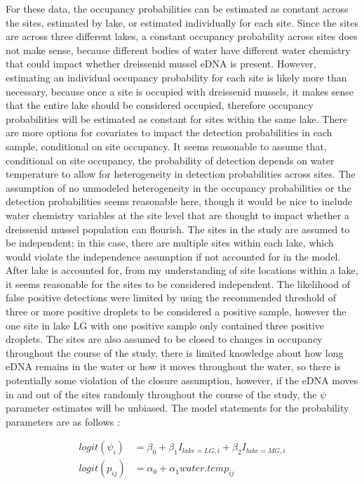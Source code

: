 \documentclass[12pt]{article}\usepackage[]{graphicx}\usepackage[]{color}
\begin{document}
For these data, the occupancy probabilities can be estimated as constant across the sites, estimated by lake, or estimated individually for each site. Since the sites are across three different lakes, a constant occupancy probability across sites does not make sense, because different bodies of water have different water chemistry that could impact whether dreissenid mussel eDNA is present. However, estimating an individual occupancy probability for each site is likely more than necessary, because once a site is occupied with dreissenid mussels, it makes sense that the entire lake should be considered occupied, therefore occupancy probabilities will be estimated as constant for sites within the same lake. There are more options for covariates to impact the detection probabilities in each sample, conditional on site occupancy. It seems reasonable to assume that, conditional on site occupancy, the probability of detection depends on water temperature to allow for heterogeneity in detection probabilities across sites. The assumption of no unmodeled heterogeneity in the occupancy probabilities or the detection probabilities seems reasonable here, though it would be nice to include water chemistry variables at the site level that are thought to impact whether a dreissenid mussel population can flourish. The sites in the study are assumed to be independent; in this case, there are multiple sites within each lake, which would violate the independence assumption if not accounted for in the model. After lake is accounted for, from my understanding of site locations within a lake, it seems reasonable for the sites to be considered independent. The likelihood of false positive detections were limited by using the recommended threshold of three or more positive droplets to be considered a positive sample, however the one site in lake LG with one positive sample only contained three positive droplets. The sites are also assumed to be closed to changes in occupancy throughout the course of the study, there is limited knowledge about how long eDNA remains in the water or how it moves throughout the water, so there is potentially some violation of the closure assumption, however, if the eDNA moves in and out of the sites randomly throughout the course of the study, the $\psi$ parameter estimates will be unbiased. The model statements for the probability parameters are as follows :  

$$
\begin{aligned}
logit(\psi_i) &= \beta_0 + \beta_1I_{lake = LG, i} + \beta_2I_{lake = MG, i}\\
logit(p_{ij}) &= \alpha_0 + \alpha_1water.temp_{ij}
\end{aligned}
$$
\end{document}
